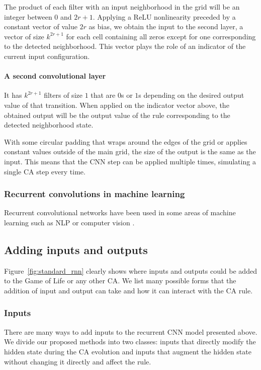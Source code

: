 The product of each filter with an input neighborhood in the grid will be an
integer between $0$ and $2r + 1$. Applying a ReLU nonlinearity preceded by a
constant vector of value $2r$ as bias, we obtain the input to the second layer,
a vector of size $k^{2r + 1}$ for each cell containing all zeros except for
one corresponding to the detected neighborhood. This vector plays the role of an
indicator of the current input configuration.

\paragraph{A second convolutional layer} It has $k^{2r + 1}$ filters of size $1$
that are $0$s or $1$s depending on the desired output value of that transition.
When applied on the indicator vector above, the obtained output will be the
output value of the rule corresponding to the detected neighborhood state.

With some circular padding that wraps around the edges of the grid or applies
constant values outside of the main grid, the size of the output is the same as
the input. This means that the CNN step can be applied multiple times, simulating a
single \ac{CA} step every time.

\subsubsection{Recurrent convolutions in machine learning}

Recurrent convolutional networks have been used in some areas of machine
learning such as NLP or computer vision
\parencite{pinheiroRecurrentConvolutionalNeural2014,
  laiRecurrentConvolutionalNeural2015}.

\subsection{Adding inputs and outputs\label{sec:adding-inputs-outp}}

Figure~\ref{fig:standard_rnn} clearly shows where inputs and outputs could
be added to the Game of Life or any other \ac{CA}. We list many possible forms
that the addition of input and output can take and how it can interact with the \ac{CA} rule.

\subsubsection{Inputs}
There are many ways to add inputs to the recurrent \ac{CNN} model presented
above. We divide our proposed methods into two classes: inputs that directly
modify the hidden state during the CA evolution and inputs that augment the
hidden state without changing it directly and affect the rule.


